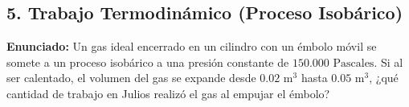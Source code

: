 \documentclass[12pt, letterpaper]{article}
\begin{document}
	\subsection*{5. Trabajo Termodinámico (Proceso Isobárico)}
	\noindent \textbf{Enunciado:} Un gas ideal encerrado en un cilindro con un émbolo móvil se somete a un proceso isobárico a una presión constante de $150.000 \text{ Pascales}$. Si al ser calentado, el volumen del gas se expande desde $0.02 \text{ m}^3$ hasta $0.05 \text{ m}^3$, ¿qué cantidad de trabajo en Julios realizó el gas al empujar el émbolo?
	
\end{document}
